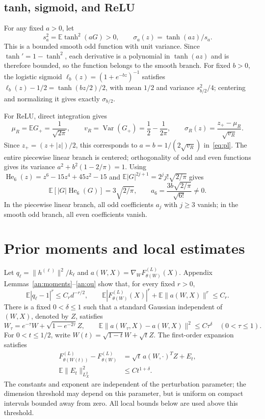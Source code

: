 \documentclass[a4paper]{tufte-handout}
\newcommand{\E}{\mathbb E}
\begin{document}
\begin{fullwidth}
\subsection{tanh, sigmoid, and ReLU}
For any fixed $a>0$, let
\[
s_a^2=\E\tanh^2(aG)>0,\qquad \sigma_a(z)=\tanh(az)/s_a.
\]
This is a bounded smooth odd function with unit variance. Since $\tanh'=1-\tanh^2$,
each derivative is a polynomial in $\tanh(az)$ and is therefore bounded, so the function belongs to the smooth branch.
For fixed $b>0$, the logistic sigmoid $\ell_b(z)=(1+e^{-bz})^{-1}$ satisfies
$\ell_b(z)-1/2=\tanh(bz/2)/2$, with mean $1/2$ and variance $s_{b/2}^2/4$;
centering and normalizing it gives exactly $\sigma_{b/2}$.

For ReLU, direct integration gives
\[
\mu_R=\E G_+=\frac1{\sqrt{2\pi}},\qquad
v_R=\operatorname{Var}(G_+)=\frac12-\frac1{2\pi},\qquad
\sigma_R(z)=\frac{z_+-\mu_R}{\sqrt{v_R}}.
\]
Since $z_+=(z+|z|)/2$, this corresponds to
$a=b=1/(2\sqrt{v_R})$ in~\eqref{eq:pl}.
The entire piecewise linear branch is centered; orthogonality of odd and even functions gives its variance
$a^2+b^2(1-2/\pi)=1$.
Using $\operatorname{He}_6(z)=z^6-15z^4+45z^2-15$
and $\E|G|^{2j+1}=2^j j!\sqrt{2/\pi}$ gives
\[
\E[|G|\operatorname{He}_6(G)]=3\sqrt{2/\pi},\qquad
a_6=\frac{3b\sqrt{2/\pi}}{\sqrt{6!}}\ne0.
\]
In the piecewise linear branch, all odd coefficients $a_j$ with $j\ge3$ vanish; in the smooth odd branch, all even coefficients vanish.

\section{Prior moments and local estimates}
Let $q_\ell=\|h^{(\ell)}\|^2/k_\ell$ and $a(W,X)=\nabla_WF_{\theta(W)}^{(L)}(X)$.
Appendix Lemmas~\ref{an:moments}--\ref{an:ou} show that, for every fixed $r>0$,
\begin{equation}\label{eq:moments}
 \E|q_\ell-1|^r\le C_r d^{-r/2},\qquad
 \E|F_{\theta(W)}^{(L)}(X)|^r+\E\|a(W,X)\|^r\le C_r.
\end{equation}
There is a fixed $0<\delta\le1$ such that a standard Gaussian independent of $(W,X)$, denoted by $Z$, satisfies
\begin{equation}\label{eq:gradient-stability}
 W_\tau=e^{-\tau}W+\sqrt{1-e^{-2\tau}}Z,\qquad
 \E\|a(W_\tau,X)-a(W,X)\|^2\le C\tau^\delta\quad(0<\tau\le1).
\end{equation}
For $0<t\le1/2$, write $W(t)=\sqrt{1-t}W+\sqrt tZ$. The first-order expansion satisfies
\begin{equation}\label{eq:ou-rem}
 \begin{aligned}
 F_{\theta(W(t))}^{(L)}-F_{\theta(W)}^{(L)}&=\sqrt t\,a(W,\cdot)^TZ+E_t,\\
 \E\|E_t\|_{L_X^2}^2&\le Ct^{1+\delta}.
 \end{aligned}
\end{equation}
The constants and exponent are independent of the perturbation parameter; the dimension threshold may depend on this parameter, but is uniform on compact intervals bounded away from zero. All local bounds below are used above this threshold.


\end{fullwidth}
\end{document}
